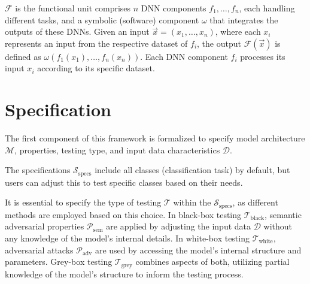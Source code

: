 $\mathcal{F}$ is the functional unit comprises $n$ DNN components $ f_1, \dots, f_n $, each handling different tasks, and a symbolic (software) component $ \omega $ that integrates the outputs of these DNNs. Given an input $\vec{x} = (x_1, \dots, x_n)$, where each $x_i$ represents an input from the respective dataset of $f_i$, the output $\mathcal{F}(\vec{x})$ is defined as $\omega(f_1(x_1), \dots, f_n(x_n))$. Each DNN component $f_i$ processes its input $x_i$ according to its specific dataset.


\section{Specification}
The first component of this framework is formalized to specify model architecture $\mathcal{M}$, properties, testing type, and input data characteristics $\mathcal{D}$. 

The specifications $\mathcal{S}_{\text{specs}}$ include all classes (classification task) by default, but users can adjust this to test specific classes based on their needs.

It is essential to specify the type of testing $\mathcal{T}$ within the $\mathcal{S}_{\text{specs}}$, as different methods are employed based on this choice. In black-box testing $\mathcal{T}_{\text{black}}$, semantic adversarial properties $\mathcal{P}_{\text{sem}}$ are applied by adjusting the input data $\mathcal{D}$ without any knowledge of the model's internal details. In white-box testing $\mathcal{T}_{\text{white}}$, adversarial attacks $\mathcal{P}_{\text{adv}}$ are used by accessing the model's internal structure and parameters. Grey-box testing $\mathcal{T}_{\text{grey}}$ combines aspects of both, utilizing partial knowledge of the model’s structure to inform the testing process. 



